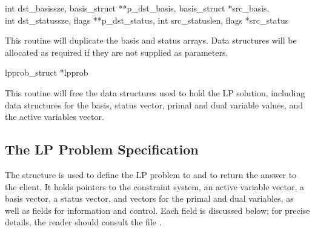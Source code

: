 \begin{subrdoc}
  \item
	  {int dst_basissze, basis_struct **p_dst_basis,
	   basis_struct *src_basis, \\ int dst_statussze,
	   flags **p_dst_status, int src_statuslen, flags *src_status}

  This routine will duplicate the basis and status arrays.
  Data structures will be allocated as required if they are not supplied as
  parameters.

  \item
	  {lpprob_struct *lpprob}

  This routine will free the data structures used to hold the LP solution,
  including data structures for the basis, status vector, primal and dual
  variable values, and the active variables vector.
\end{subrdoc}


\subsection{The LP Problem Specification}
\label{sec:LPProbSpec}

The structure  is used to define the LP
problem to \dylp and to return the answer to the client.
It holds pointers to the constraint system, an active
variable vector, a basis vector, a status vector, and vectors
for the primal and dual variables, as well as fields for information and
control.
Each field is discussed below; for precise details, the reader should consult
the file .

